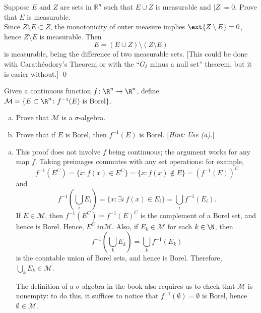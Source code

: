 \begin{hwsol}
Suppose $E$ and $Z$ are sets in $\mathbb R^n$ such that $E\cup Z$ is measurable and $|Z|=0$. Prove that $E$ is measurable. \\

\pf Since $Z \setminus E \subset Z$, the monotonicity of outer measure implies $\ext{Z \setminus E}=0$, hence $Z \setminus E$ is measurable. Then 
        \[
        E = (E\cup Z)\setminus (Z\setminus E)
        \]
is measurable, being the difference of two measurable sets. [This could be done with Carath\'eodory's Theorem or with the ``$G_\delta$ minus a null set'' theorem, but it is easier without.] \qed \\
\end{hwsol}


\begin{hwsol}
Given a continuous function $f \colon \R^n \to \R^n$, define $\mathcal{M}= \{ E \subset \R^n \colon f^{-1}(E) \text{ is Borel} \}$. 
	\begin{enumerate}[(a)]
	\item Prove that $\mathcal{M}$ is a $\sigma$-algebra.
	\item Prove that if $E$ is Borel, then $f^{-1}(E)$ is Borel. [\emph{Hint: Use (a).}]
	\end{enumerate}

\pf
\begin{enumerate}[(a)]
\item This proof does not involve $f$ being continuous; the argument works for any map $f$. Taking preimages commutes with any set operations: for example, 
        \[
        f^{-1}(E^C)= \{ x \colon f(x) \in E^C \}= \{ x \colon f(x) \notin E \} = (f^{-1}(E))^C
        \]
and 
        \[
        f^{-1}\left( \bigcup_i E_i \right)= \{ x \colon \exists i \ f(x) \in E_i \}= \bigcup_i f^{-1}(E_i).
        \]
If $E \in \mathcal{M}$, then $f^{-1}(E^C) = f^{-1}(E)^C$ is the complement of a Borel set, and hence is Borel. Hence, $E^C\ in \mathcal{M}$. Also, if $E_k \in \mathcal{M}$ for each $k \in \N$, then 
        \[
        f^{-1}\left( \bigcup_k E_k \right)=  \bigcup_k f^{-1}(E_k) 
        \]
is the countable union of Borel sets, and hence is Borel. Therefore, $\bigcup_k E_k\in \mathcal M$. 

The definition of a $\sigma$-algebra in the book also requires us to check that $\mathcal{M}$ is nonempty: to do this, it suffices to notice that $f^{-1}(\emptyset)=\emptyset$ is Borel, hence $\emptyset \in \mathcal{M}$.  


\end{enumerate}
\end{hwsol}
